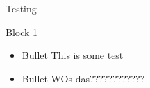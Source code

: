 \begin{frame}{Testing}
    \begin{block}{Block 1}
        \begin{itemize}
            \item Bullet This is some test
            \pause
            \item Bullet WOs das????????????
        \end{itemize}
    \end{block}
\end{frame}